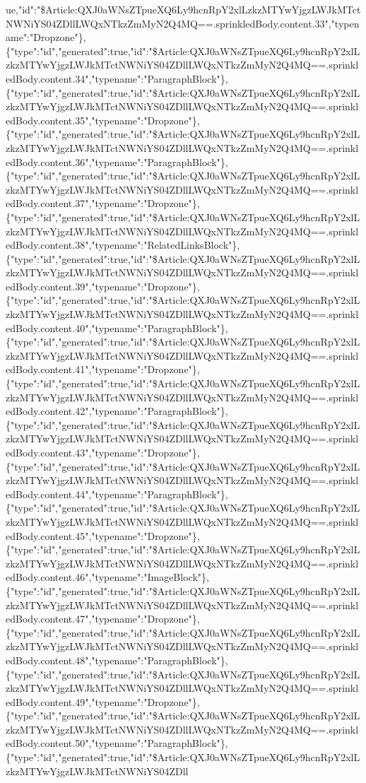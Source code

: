 ue,"id":"\$Article:QXJ0aWNsZTpueXQ6Ly9hcnRpY2xlLzkzMTYwYjgzLWJkMTctNWNiYS04ZDllLWQxNTkzZmMyN2Q4MQ==.sprinkledBody.content.33","typename":"Dropzone"\},\{"type":"id","generated":true,"id":"\$Article:QXJ0aWNsZTpueXQ6Ly9hcnRpY2xlLzkzMTYwYjgzLWJkMTctNWNiYS04ZDllLWQxNTkzZmMyN2Q4MQ==.sprinkledBody.content.34","typename":"ParagraphBlock"\},\{"type":"id","generated":true,"id":"\$Article:QXJ0aWNsZTpueXQ6Ly9hcnRpY2xlLzkzMTYwYjgzLWJkMTctNWNiYS04ZDllLWQxNTkzZmMyN2Q4MQ==.sprinkledBody.content.35","typename":"Dropzone"\},\{"type":"id","generated":true,"id":"\$Article:QXJ0aWNsZTpueXQ6Ly9hcnRpY2xlLzkzMTYwYjgzLWJkMTctNWNiYS04ZDllLWQxNTkzZmMyN2Q4MQ==.sprinkledBody.content.36","typename":"ParagraphBlock"\},\{"type":"id","generated":true,"id":"\$Article:QXJ0aWNsZTpueXQ6Ly9hcnRpY2xlLzkzMTYwYjgzLWJkMTctNWNiYS04ZDllLWQxNTkzZmMyN2Q4MQ==.sprinkledBody.content.37","typename":"Dropzone"\},\{"type":"id","generated":true,"id":"\$Article:QXJ0aWNsZTpueXQ6Ly9hcnRpY2xlLzkzMTYwYjgzLWJkMTctNWNiYS04ZDllLWQxNTkzZmMyN2Q4MQ==.sprinkledBody.content.38","typename":"RelatedLinksBlock"\},\{"type":"id","generated":true,"id":"\$Article:QXJ0aWNsZTpueXQ6Ly9hcnRpY2xlLzkzMTYwYjgzLWJkMTctNWNiYS04ZDllLWQxNTkzZmMyN2Q4MQ==.sprinkledBody.content.39","typename":"Dropzone"\},\{"type":"id","generated":true,"id":"\$Article:QXJ0aWNsZTpueXQ6Ly9hcnRpY2xlLzkzMTYwYjgzLWJkMTctNWNiYS04ZDllLWQxNTkzZmMyN2Q4MQ==.sprinkledBody.content.40","typename":"ParagraphBlock"\},\{"type":"id","generated":true,"id":"\$Article:QXJ0aWNsZTpueXQ6Ly9hcnRpY2xlLzkzMTYwYjgzLWJkMTctNWNiYS04ZDllLWQxNTkzZmMyN2Q4MQ==.sprinkledBody.content.41","typename":"Dropzone"\},\{"type":"id","generated":true,"id":"\$Article:QXJ0aWNsZTpueXQ6Ly9hcnRpY2xlLzkzMTYwYjgzLWJkMTctNWNiYS04ZDllLWQxNTkzZmMyN2Q4MQ==.sprinkledBody.content.42","typename":"ParagraphBlock"\},\{"type":"id","generated":true,"id":"\$Article:QXJ0aWNsZTpueXQ6Ly9hcnRpY2xlLzkzMTYwYjgzLWJkMTctNWNiYS04ZDllLWQxNTkzZmMyN2Q4MQ==.sprinkledBody.content.43","typename":"Dropzone"\},\{"type":"id","generated":true,"id":"\$Article:QXJ0aWNsZTpueXQ6Ly9hcnRpY2xlLzkzMTYwYjgzLWJkMTctNWNiYS04ZDllLWQxNTkzZmMyN2Q4MQ==.sprinkledBody.content.44","typename":"ParagraphBlock"\},\{"type":"id","generated":true,"id":"\$Article:QXJ0aWNsZTpueXQ6Ly9hcnRpY2xlLzkzMTYwYjgzLWJkMTctNWNiYS04ZDllLWQxNTkzZmMyN2Q4MQ==.sprinkledBody.content.45","typename":"Dropzone"\},\{"type":"id","generated":true,"id":"\$Article:QXJ0aWNsZTpueXQ6Ly9hcnRpY2xlLzkzMTYwYjgzLWJkMTctNWNiYS04ZDllLWQxNTkzZmMyN2Q4MQ==.sprinkledBody.content.46","typename":"ImageBlock"\},\{"type":"id","generated":true,"id":"\$Article:QXJ0aWNsZTpueXQ6Ly9hcnRpY2xlLzkzMTYwYjgzLWJkMTctNWNiYS04ZDllLWQxNTkzZmMyN2Q4MQ==.sprinkledBody.content.47","typename":"Dropzone"\},\{"type":"id","generated":true,"id":"\$Article:QXJ0aWNsZTpueXQ6Ly9hcnRpY2xlLzkzMTYwYjgzLWJkMTctNWNiYS04ZDllLWQxNTkzZmMyN2Q4MQ==.sprinkledBody.content.48","typename":"ParagraphBlock"\},\{"type":"id","generated":true,"id":"\$Article:QXJ0aWNsZTpueXQ6Ly9hcnRpY2xlLzkzMTYwYjgzLWJkMTctNWNiYS04ZDllLWQxNTkzZmMyN2Q4MQ==.sprinkledBody.content.49","typename":"Dropzone"\},\{"type":"id","generated":true,"id":"\$Article:QXJ0aWNsZTpueXQ6Ly9hcnRpY2xlLzkzMTYwYjgzLWJkMTctNWNiYS04ZDllLWQxNTkzZmMyN2Q4MQ==.sprinkledBody.content.50","typename":"ParagraphBlock"\},\{"type":"id","generated":true,"id":"\$Article:QXJ0aWNsZTpueXQ6Ly9hcnRpY2xlLzkzMTYwYjgzLWJkMTctNWNiYS04ZDll